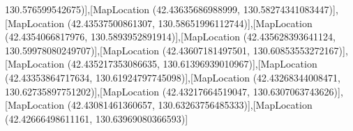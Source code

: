 130.576599542675)],[MapLocation (42.43635686988999, 130.58274341083447)],[MapLocation (42.43537500861307, 130.58651996112744)],[MapLocation (42.4354066817976, 130.5893952891914)],[MapLocation (42.435628393641124, 130.59978080249707)],[MapLocation (42.43607181497501, 130.60853553272167)],[MapLocation (42.435217353086635, 130.61396939010967)],[MapLocation (42.43353864717634, 130.61924797745098)],[MapLocation (42.43268344008471, 130.62735897751202)],[MapLocation (42.43217664519047, 130.6307063743626)],[MapLocation (42.43081461360657, 130.63263756485333)],[MapLocation (42.42666498611161, 130.63969080366593)]